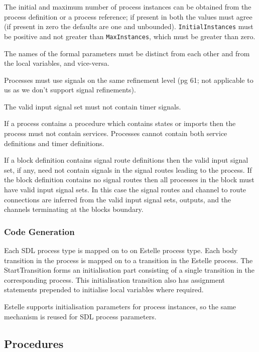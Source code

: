 The initial and maximum number of process instances
can be obtained from the process definition or a
process reference; if present in both the values must agree
(if present in zero the defaults are one and unbounded).
{\tt InitialInstances} must be positive and not greater than
{\tt MaxInstances}, which must be greater than zero.

The names of the formal parameters must be distinct from each other
and from the local variables, and vice-versa.

Processes must use signals on the same refinement level (pg 61; not
applicable to us as we don't support signal refinements).

The valid input signal set must not contain timer signals.

If a process contains a procedure which contains states or imports
then the process must not contain services. Processes cannot contain
both service definitions and timer definitions.

If a block definition contains signal route definitions then the
valid input signal set, if any, need not contain signals in the
signal routes leading to the process. If the block definition
contains no signal routes then all processes in the block must have
valid input signal sets.
In this case the signal routes and channel to route connections are
inferred from the valid input signal sets, outputs, and the channels
terminating at the blocks boundary.

\subsubsection{Code Generation}

Each SDL process type is mapped on to on Estelle process type.
Each body transition in the process is mapped on to a transition in
the Estelle process. 
The StartTransition forms an initialisation part 
consisting of a single transition in the corresponding process.
This initialisation transition also has assignment statements
prepended to initialise local variables where required.

Estelle supports initialisation parameters for process instances,
so the same mechanism is reused for SDL process parameters.

\subsection{Procedures}

